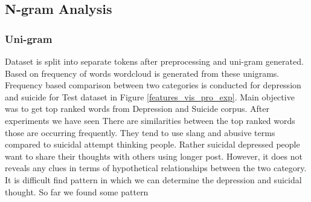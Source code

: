 \documentclass[sn-mathphys,Numbered]{sn-jnl}%
\theoremstyle{thmstyleone}%
\theoremstyle{thmstyletwo}%
\theoremstyle{thmstylethree}%
\begin{document}
\subsection{N-gram Analysis}
\subsubsection{Uni-gram}
Dataset is split into separate tokens after preprocessing and uni-gram generated. Based on frequency of words wordcloud is generated from these unigrams. Frequency based comparison between two categories is conducted for depression and suicide for Test dataset in Figure \ref{features_vis_pro_exp}. Main objective was to get top ranked words from Depression and Suicide corpus. After experiments we have seen There are similarities between the top ranked words those are occurring frequently. They tend to use slang and abusive terms compared to suicidal attempt thinking people. Rather suicidal depressed people want to share their thoughts with others using longer post. However, it does not reveals any clues in terms of hypothetical relationships between the two category. It is difficult find pattern in which we can determine the depression and suicidal thought. So far we found some pattern 
%
\end{document}
